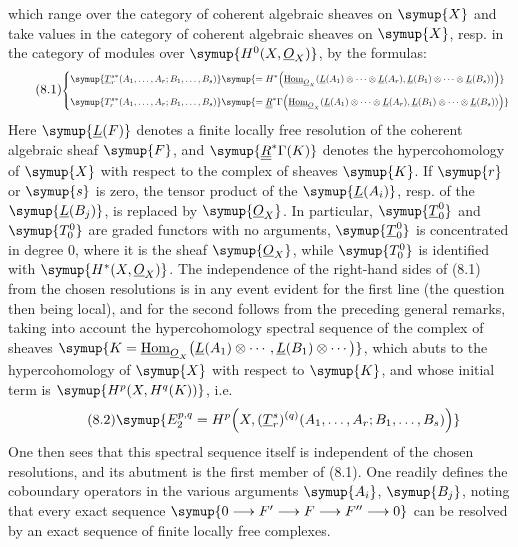 which range over the category of coherent algebraic sheaves on $\symup{X}$ and take
values in the category of coherent algebraic sheaves on $\symup{X}$, resp.
in the category of modules over $\symup{H^{0}(X,\Osh_X)}$, by the formulas:
\begin{equation}\tag{8.1}
\resizebox{\textwidth}{!}{$
\left\{
\begin{aligned}
\symup{\underline{T}_{r}^{s*}(A_1,\ldots,A_r;B_1,\ldots,B_s)}
&
\symup{={}H^{*}\!\left(
    \Homsh_{\Osh_X}\!\left(
      \underline{L}(A_1)\otimes\cdots\otimes \underline{L}(A_r),
      \underline{L}(B_1)\otimes\cdots\otimes \underline{L}(B_s)
    \right)\right)}
\\[3pt]
\symup{T_{r}^{s*}(A_1,\ldots,A_r;B_1,\ldots,B_s)}
&
\symup{={}\underline{\underline{R}}^{*}\Gamma\!\left(
    \Homsh_{\Osh_X}\!\left(
      \underline{L}(A_1)\otimes\cdots\otimes \underline{L}(A_r),
      \underline{L}(B_1)\otimes\cdots\otimes \underline{L}(B_s)
    \right)\right)}
\end{aligned}
\right.
$}
\end{equation}
Here $\symup{\underline{L}(F)}$ denotes a finite locally free resolution of the coherent algebraic
sheaf $\symup{F}$, and $\symup{\underline{\underline{R}}^{*}\Gamma(K)}$ denotes the hypercohomology of $\symup{X}$ with
respect to the complex of sheaves $\symup{K}$. If $\symup{r}$ or $\symup{s}$ is zero, the tensor product
of the $\symup{\underline{L}(A_i)}$, resp. of the $\symup{\underline{L}(B_j)}$, is replaced by $\symup{\Osh_X}$. In
particular, $\symup{\underline{T}_{0}^{0}}$ and $\symup{T_{0}^{0}}$ are graded functors with no
arguments, $\symup{\underline{T}_{0}^{0}}$ is concentrated in degree 0, where it is the
sheaf $\symup{\Osh_X}$, while $\symup{T_{0}^{0}}$ is identified with $\symup{H^{*}(X,\Osh_X)}$. The
independence of the right-hand sides of (8.1) from the chosen resolutions is in
any event evident for the first line (the question then being local), and for
the second follows from the preceding general remarks, taking into account the
hypercohomology spectral sequence of the complex of sheaves
$\symup{K=\Homsh_{\Osh_X}\bigl(\underline{L}(A_1)\otimes\cdots,
      \underline{L}(B_1)\otimes\cdots\bigr)}$,
which abuts to the hypercohomology of $\symup{X}$ with respect to $\symup{K}$, and whose initial term
is $\symup{H^{p}(X,H^{q}(K))}$, i.e.
\begin{equation}\tag{8.2}
  \symup{E_{2}^{p,q}
  =H^{p}\!\left(X,
    (\underline{T}_{r}^{s})^{(q)}
      (A_1,\ldots,A_r;B_1,\ldots,B_s)\right)}
\end{equation}
One then sees that this spectral sequence itself is independent of the chosen
resolutions, and its abutment is the first member of (8.1). One readily defines the coboundary
operators in the various arguments $\symup{A_i}$, $\symup{B_j}$, noting that every
exact sequence
$\symup{0\longrightarrow F'\longrightarrow F\longrightarrow F''\longrightarrow0}$
can be resolved by an exact sequence of finite locally free complexes.

